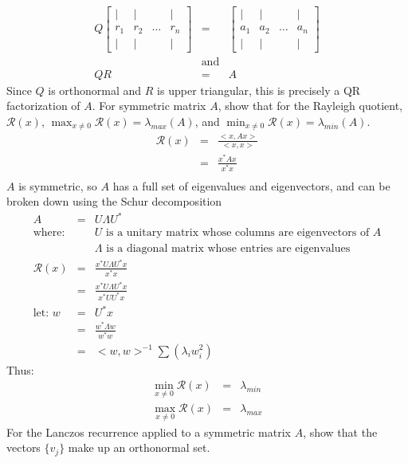 \documentclass{article}
\newcommand{\ea}[1]{\begin{eqnarray*}#1\end{eqnarray*}}
\newcommand{\mat}[2]{\left[\begin{array}{#1}#2\end{array}\right]}
\newcommand{\R}{\mathcal{R}}
\begin{document}
\ea{ 
Q\mat{cccc}{ | & | & & | \\
            r_1 & r_2 &\dots &r_n \\
		     |  & | & & | }
			 &=& \mat{cccc}{ | & | & & | \\
			                 a_1 & a_2 & \dots & a_n \\
							  |  & | & & | } \\
	&\mbox{and}& \\
	QR&=& A
}
Since $Q$ is orthonormal and $R$ is upper triangular, this is precisely a QR
factorization of $A$.
 For symmetric matrix $A$, show that for the Rayleigh quotient, $\R(x)$, 
$\max_{x \ne 0} \R(x)=\lambda_{max}(A)$, and $\min_{x\ne 0} \R(x)=\lambda_{min}(A)$.
\ea{ \R(x) &=& \frac{ <x,Ax> }{ <x,x> } \\
	&=& \frac{ x^*Ax }{ x^*x } \\
}
$A$ is symmetric, so $A$ has a full set of eigenvalues and eigenvectors, and can
be broken down using the Schur decomposition
\ea{
	A &=& U \Lambda U^* \\
	\textrm{where:} & & U \textrm{ is a unitary matrix whose columns are eigenvectors of $A$} \\
					& & \Lambda \textrm{ is a diagonal matrix whose entries are eigenvalues} \\
	\R(x) &=& \frac{ x^* U \Lambda U^* x }{x^*x}\\
	&=& \frac{ x^* U \Lambda U^* x }{x^*UU^*x}\\
	\textrm{let: } w &=& U^*x \\
	&=& \frac{ w^*\Lambda w }{w^*w} \\
	&=& <w,w>^{-1} \sum (\lambda_i w_i^2)
}
Thus:
\ea{
	\min_{x\neq 0} \R(x) &=& \lambda_{min} \\
	\max_{x\neq 0} \R(x) &=& \lambda_{max}
}
 For the Lanczos recurrence applied to a symmetric matrix $A$, show 
that the vectors $\{v_j\}$ make up an orthonormal set.
\end{document}
